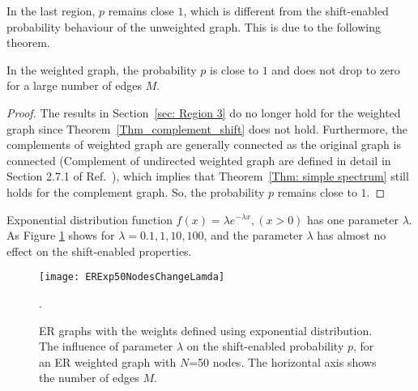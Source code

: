 \documentclass[journal]{IEEEtran}
\begin{document}
In the last region, $p$ remains close $1$, which is different from the shift-enabled probability behaviour of the unweighted graph. This is due to the following theorem.
\begin{Thm} {\label{Thm: weighted graph with large edges}}
In the weighted graph,  the probability $p$ is close to $1$ and does not drop to zero for a large number of edges $M$.
\end{Thm}
\begin{proof}
The results in Section~\ref{sec: Region 3} do no longer hold for the weighted graph since Theorem~\ref{Thm_complement_shift} does not hold. Furthermore, the complements of weighted graph are generally connected as the original graph is connected (Complement of undirected weighted graph are defined in detail in Section 2.7.1 of Ref.~\cite{networks}), 
which implies that Theorem~\ref{Thm: simple spectrum} still holds for the complement graph. So, the probability $p$ remains close to $1$.
\end{proof}

Exponential distribution function $f(x)=\lambda e^{-\lambda x},(x>0)$ has one parameter $\lambda$. As Figure \ref{fig:erexpnode20mu100lap} shows for $\lambda=0.1, 1, 10, 100$, and the parameter  $\lambda$ has almost no effect on the shift-enabled properties.
\begin{figure}[htb]
	\centering
	\texttt{[image: ERExp50NodesChangeLamda]}
	\caption{ER graphs with the weights defined using exponential distribution. The influence of parameter $\lambda$ on the shift-enabled probability $p$, for an ER weighted graph with $N$=50 nodes. The horizontal axis shows the number of edges $M$.
	}. 
	\label{fig:erexpnode20mu100lap}
\end{figure}
\end{document}
